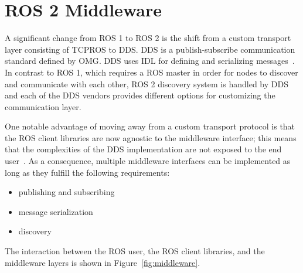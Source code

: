 \chapter{ROS 2 Middleware}

    A significant change from \ac{ROS} 1 to \ac{ROS} 2 is the shift from a custom transport layer consisting of \ac{TCPROS} to \ac{DDS}. \ac{DDS} is a publish-subscribe communication standard defined by \ac{OMG}. \ac{DDS} uses \ac{IDL} for defining and serializing messages~\cite{rosondds}. In contrast to \ac{ROS} 1, which requires a \ac{ROS} master in order for nodes to discover and communicate with each other, \ac{ROS} 2 discovery system is handled by \ac{DDS} and each of the \ac{DDS} vendors provides different options for customizing the communication layer.

    One notable advantage of moving away from a custom transport protocol is that the \ac{ROS} client libraries are now agnostic to the middleware interface; this means that the complexities of the \ac{DDS} implementation are not exposed to the end user~\cite{ros2middle}. As a consequence, multiple middleware interfaces can be implemented as long as they fulfill the following requirements: 
    \begin{itemize}
        \item publishing and subscribing
        \item message serialization
        \item discovery
    \end{itemize}\label{ite:rmwreqs}
    
    The interaction between the \ac{ROS} user, the \ac{ROS} client libraries, and the middleware layers is shown in Figure~\ref{fig:middleware}.

